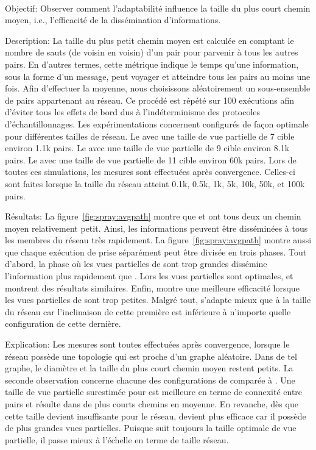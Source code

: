 \ \\

\begin{asparadesc}
\item [Objectif:] Observer comment l'adaptabilité influence la taille du plus
  court chemin moyen, i.e., l'efficacité de la dissémination d'informations.
\item [Description:] La taille du plus petit chemin moyen est calculée en
  comptant le nombre de sauts (de voisin en voisin) d'un pair pour parvenir à
  tous les autres pairs. En d'autres termes, cette métrique indique le temps
  qu'une information, sous la forme d'un message, peut voyager et atteindre tous
  les pairs au moins une fois. Afin d'effectuer la moyenne, nous choisissons
  aléatoirement un sous-ensemble de pairs appartenant au réseau. Ce procédé est
  répété sur 100 exécutions afin d'éviter tous les effets de bord dus à
  l'indéterminisme des protocoles d'échantillonnages. Les expérimentations
  concernent \CYCLON configurés de façon optimale pour différentes tailles de
  réseau. Le \CYCLON avec une taille de vue partielle de 7 cible environ 1.1k
  pairs. Le \CYCLON avec une taille de vue partielle de 9 cible environ 8.1k
  pairs. Le \CYCLON avec une taille de vue partielle de 11 cible environ 60k
  pairs. Lors de toutes ces simulations, les mesures sont effectuées après
  convergence. Celles-ci sont faites lorsque la taille du réseau atteint 0.1k,
  0.5k, 1k, 5k, 10k, 50k, et 100k pairs. 
\item [Résultats:] La figure~\ref{fig:spray:avgpath} montre que \CYCLON et
  \SPRAY ont tous deux un chemin moyen relativement petit. Ainsi, les
  informations peuvent être disséminées à tous les membres du réseau très
  rapidement. La figure~\ref{fig:spray:avgpath} montre aussi que chaque
  exécution de \CYCLON prise séparément peut être divisée en trois phases.  Tout
  d'abord, la phase où les vues partielles de \CYCLON sont trop grandes
  dissémine l'information plus rapidement que \SPRAY. Lors les vues partielles
  sont optimales, \CYCLON et \SPRAY montrent des résultats similaires. Enfin,
  \SPRAY montre une meilleure efficacité lorsque les vues partielles de \CYCLON
  sont trop petites. Malgré tout, \SPRAY s'adapte mieux que \CYCLON à la taille
  du réseau car l'inclinaison de cette première est inférieure à n'importe
  quelle configuration de cette dernière.
\item [Explication:] Les mesures sont toutes effectuées après convergence,
  lorsque le réseau possède une topologie qui est proche d'un graphe aléatoire.
  Dans de tel graphe, le diamètre et la taille du plus court chemin moyen
  restent petits. La seconde observation concerne chacune des configurations de
  \CYCLON comparée à \SPRAY. Une taille de vue partielle surestimée pour \CYCLON
  est meilleure en terme de connexité entre pairs et résulte dans de plus courts
  chemins en moyenne. En revanche, dès que cette taille devient insuffisante
  pour le réseau, \SPRAY devient plus efficace car il possède de plus grandes
  vues partielles. Puisque \SPRAY suit toujours la taille optimale de vue
  partielle, il passe mieux à l'échelle en terme de taille réseau.
\end{asparadesc}

